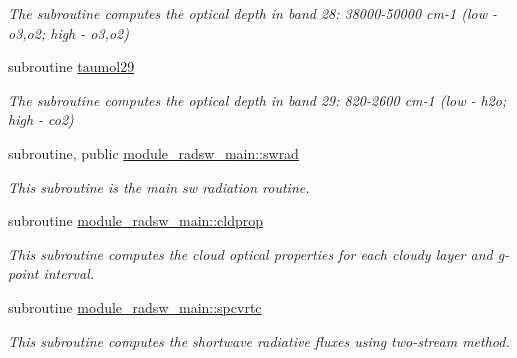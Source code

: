 \begin{DoxyCompactItemize}
\begin{DoxyCompactList}\small\item\em The subroutine computes the optical depth in band 28\+: 38000-\/50000 cm-\/1 (low -\/ o3,o2; high -\/ o3,o2) \end{DoxyCompactList}\item 
subroutine \hyperlink{zhang__orig_2radsw__main_8f_a08e2db10432d07392f29a49bc5b5c640}{taumol29}
\begin{DoxyCompactList}\small\item\em The subroutine computes the optical depth in band 29\+: 820-\/2600 cm-\/1 (low -\/ h2o; high -\/ co2) \end{DoxyCompactList}\end{DoxyCompactItemize}
{\bf }\par
\begin{DoxyCompactItemize}
\item 
subroutine, public \hyperlink{group__module__radsw__main_gad6ccb1359bb4a42c26b2b03b836035d1}{module\+\_\+radsw\+\_\+main\+::swrad}
\begin{DoxyCompactList}\small\item\em This subroutine is the main sw radiation routine. \end{DoxyCompactList}\end{DoxyCompactItemize}

{\bf }\par
\begin{DoxyCompactItemize}
\item 
subroutine \hyperlink{group__module__radsw__main_ga1a3bb4385e7a610aa7eec9759383ffe9}{module\+\_\+radsw\+\_\+main\+::cldprop}
\begin{DoxyCompactList}\small\item\em This subroutine computes the cloud optical properties for each cloudy layer and g-\/point interval. \end{DoxyCompactList}\end{DoxyCompactItemize}

{\bf }\par
\begin{DoxyCompactItemize}
\item 
subroutine \hyperlink{group__module__radsw__main_gaed15bfde1b9f2286c58f6c807f8bf479}{module\+\_\+radsw\+\_\+main\+::spcvrtc}
\begin{DoxyCompactList}\small\item\em This subroutine computes the shortwave radiative fluxes using two-\/stream method. \end{DoxyCompactList}\end{DoxyCompactItemize}

